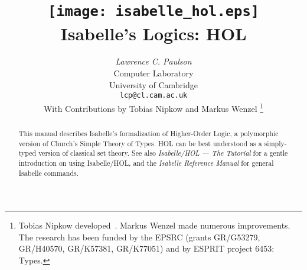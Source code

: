 \documentclass[12pt]{report}
\title{\texttt{[image: isabelle\_hol.eps]} \\[4ex] 
       Isabelle's Logics: HOL}
\author{{\em Lawrence C. Paulson}\\
        Computer Laboratory \\ University of Cambridge \\
        \texttt{lcp@cl.cam.ac.uk}\\[3ex] 
        With Contributions by Tobias Nipkow and Markus Wenzel%
        \thanks{Tobias Nipkow developed~\HOL{}.  Markus Wenzel made numerous
          improvements.  The research has been funded by the EPSRC (grants
          GR/G53279, GR/H40570, GR/K57381, GR/K77051) and by ESPRIT project
          6453: Types.}}
\begin{document}
\maketitle 

\begin{abstract}
  This manual describes Isabelle's formalization of Higher-Order Logic, a
  polymorphic version of Church's Simple Theory of Types.  HOL can be best
  understood as a simply-typed version of classical set theory.  See also
  \emph{Isabelle/HOL --- The Tutorial} for a gentle introduction on using
  Isabelle/HOL, and the \emph{Isabelle Reference Manual} for general Isabelle
  commands.
\end{abstract}

 \tableofcontents \clearfirst





\end{document}
